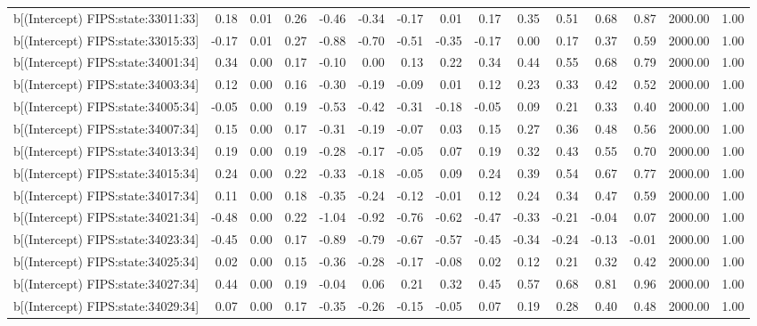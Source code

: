 \begin{table}[ht]
\begin{tabular}{rrrrrrrrrrrrrrr}
  b[(Intercept) FIPS:state:33011:33] & 0.18 & 0.01 & 0.26 & -0.46 & -0.34 & -0.17 & 0.01 & 0.17 & 0.35 & 0.51 & 0.68 & 0.87 & 2000.00 & 1.00 \\ 
  b[(Intercept) FIPS:state:33015:33] & -0.17 & 0.01 & 0.27 & -0.88 & -0.70 & -0.51 & -0.35 & -0.17 & 0.00 & 0.17 & 0.37 & 0.59 & 2000.00 & 1.00 \\ 
  b[(Intercept) FIPS:state:34001:34] & 0.34 & 0.00 & 0.17 & -0.10 & 0.00 & 0.13 & 0.22 & 0.34 & 0.44 & 0.55 & 0.68 & 0.79 & 2000.00 & 1.00 \\ 
  b[(Intercept) FIPS:state:34003:34] & 0.12 & 0.00 & 0.16 & -0.30 & -0.19 & -0.09 & 0.01 & 0.12 & 0.23 & 0.33 & 0.42 & 0.52 & 2000.00 & 1.00 \\ 
  b[(Intercept) FIPS:state:34005:34] & -0.05 & 0.00 & 0.19 & -0.53 & -0.42 & -0.31 & -0.18 & -0.05 & 0.09 & 0.21 & 0.33 & 0.40 & 2000.00 & 1.00 \\ 
  b[(Intercept) FIPS:state:34007:34] & 0.15 & 0.00 & 0.17 & -0.31 & -0.19 & -0.07 & 0.03 & 0.15 & 0.27 & 0.36 & 0.48 & 0.56 & 2000.00 & 1.00 \\ 
  b[(Intercept) FIPS:state:34013:34] & 0.19 & 0.00 & 0.19 & -0.28 & -0.17 & -0.05 & 0.07 & 0.19 & 0.32 & 0.43 & 0.55 & 0.70 & 2000.00 & 1.00 \\ 
  b[(Intercept) FIPS:state:34015:34] & 0.24 & 0.00 & 0.22 & -0.33 & -0.18 & -0.05 & 0.09 & 0.24 & 0.39 & 0.54 & 0.67 & 0.77 & 2000.00 & 1.00 \\ 
  b[(Intercept) FIPS:state:34017:34] & 0.11 & 0.00 & 0.18 & -0.35 & -0.24 & -0.12 & -0.01 & 0.12 & 0.24 & 0.34 & 0.47 & 0.59 & 2000.00 & 1.00 \\ 
  b[(Intercept) FIPS:state:34021:34] & -0.48 & 0.00 & 0.22 & -1.04 & -0.92 & -0.76 & -0.62 & -0.47 & -0.33 & -0.21 & -0.04 & 0.07 & 2000.00 & 1.00 \\ 
  b[(Intercept) FIPS:state:34023:34] & -0.45 & 0.00 & 0.17 & -0.89 & -0.79 & -0.67 & -0.57 & -0.45 & -0.34 & -0.24 & -0.13 & -0.01 & 2000.00 & 1.00 \\ 
  b[(Intercept) FIPS:state:34025:34] & 0.02 & 0.00 & 0.15 & -0.36 & -0.28 & -0.17 & -0.08 & 0.02 & 0.12 & 0.21 & 0.32 & 0.42 & 2000.00 & 1.00 \\ 
  b[(Intercept) FIPS:state:34027:34] & 0.44 & 0.00 & 0.19 & -0.04 & 0.06 & 0.21 & 0.32 & 0.45 & 0.57 & 0.68 & 0.81 & 0.96 & 2000.00 & 1.00 \\ 
  b[(Intercept) FIPS:state:34029:34] & 0.07 & 0.00 & 0.17 & -0.35 & -0.26 & -0.15 & -0.05 & 0.07 & 0.19 & 0.28 & 0.40 & 0.48 & 2000.00 & 1.00 \\ 

\end{tabular}
\end{table}
